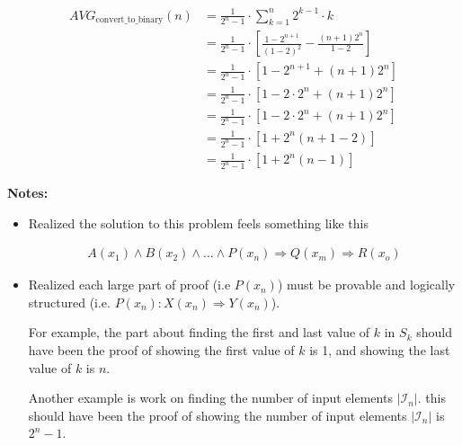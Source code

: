 \documentclass[12pt]{article}
\begin{document}
\begin{enumerate}[a.]
\begin{mdframed}
\begin{enumerate}[1.]
\begin{mdframed}
            \begin{align}
                AVG_{\text{convert\_to\_binary}}(n) &= \frac{1}{2^n - 1} \cdot \sum\limits_{k = 1}^n 2^{k-1} \cdot k\\
                &= \frac{1}{2^n - 1} \cdot \left[ \frac{1 - 2^{n+1}}{(1-2)^2} - \frac{(n+1)2^n}{1-2} \right]\\
                &= \frac{1}{2^n - 1} \cdot \left[ 1 - 2^{n+1} + (n+1)2^n \right]\\
                &= \frac{1}{2^n - 1} \cdot \left[ 1 - 2 \cdot 2^n + (n+1)2^n \right]\\
                &= \frac{1}{2^n - 1} \cdot \left[ 1 - 2 \cdot 2^n + (n+1)2^n \right]\\
                &= \frac{1}{2^n - 1} \cdot \left[ 1 + 2^n(n+1 - 2) \right]\\
                &= \frac{1}{2^n - 1} \cdot \left[ 1 + 2^n(n-1) \right]
            \end{align}
        \end{mdframed}
    \end{enumerate}

    \end{mdframed}

    \bigskip

    \textbf{Notes:}

    \begin{itemize}
        \item Realized the solution to this problem feels something like this

        \begin{align*}
            A(x_1) \land B(x_2) \land \dots \land P(x_n) \Rightarrow Q(x_m) \Rightarrow R(x_o)
        \end{align*}

        \item Realized each large part of proof (i.e $P(x_n)$) must be provable
        and logically structured (i.e. $P(x_n):X(x_n) \Rightarrow Y(x_n)$).

        \bigskip

        For example, the part about finding the first and last value of $k$ in $S_k$
        should have been the proof of showing the first value of $k$ is 1, and
        showing the last value of $k$ is $n$.

        \bigskip

        Another example is work on finding the number of input elements $\lvert \mathcal{I}_n \rvert$.
        this should have been the proof of showing the number of input
        elements $\lvert \mathcal{I}_n \rvert$ is $2^n - 1$.


\end{itemize}
\end{enumerate}
\end{document}
